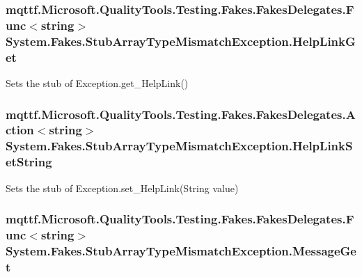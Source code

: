 \hypertarget{class_system_1_1_fakes_1_1_stub_array_type_mismatch_exception_a7c96f38bd50daca56b8a182afefb6872}{
\subsubsection[{Help\-Link\-Get}]{\setlength{\rightskip}{0pt plus 5cm}mqttf.\-Microsoft.\-Quality\-Tools.\-Testing.\-Fakes.\-Fakes\-Delegates.\-Func$<$string$>$ System.\-Fakes.\-Stub\-Array\-Type\-Mismatch\-Exception.\-Help\-Link\-Get}}\label{class_system_1_1_fakes_1_1_stub_array_type_mismatch_exception_a7c96f38bd50daca56b8a182afefb6872}


Sets the stub of Exception.\-get\-\_\-\-Help\-Link()

\hypertarget{class_system_1_1_fakes_1_1_stub_array_type_mismatch_exception_a8b1eb39903030cfaf7a44568747a2c01}{
\subsubsection[{Help\-Link\-Set\-String}]{\setlength{\rightskip}{0pt plus 5cm}mqttf.\-Microsoft.\-Quality\-Tools.\-Testing.\-Fakes.\-Fakes\-Delegates.\-Action$<$string$>$ System.\-Fakes.\-Stub\-Array\-Type\-Mismatch\-Exception.\-Help\-Link\-Set\-String}}\label{class_system_1_1_fakes_1_1_stub_array_type_mismatch_exception_a8b1eb39903030cfaf7a44568747a2c01}


Sets the stub of Exception.\-set\-\_\-\-Help\-Link(\-String value)

\hypertarget{class_system_1_1_fakes_1_1_stub_array_type_mismatch_exception_a73837ab9313804aab6830647ececefcd}{
\subsubsection[{Message\-Get}]{\setlength{\rightskip}{0pt plus 5cm}mqttf.\-Microsoft.\-Quality\-Tools.\-Testing.\-Fakes.\-Fakes\-Delegates.\-Func$<$string$>$ System.\-Fakes.\-Stub\-Array\-Type\-Mismatch\-Exception.\-Message\-Get}}\label{class_system_1_1_fakes_1_1_stub_array_type_mismatch_exception_a73837ab9313804aab6830647ececefcd}


